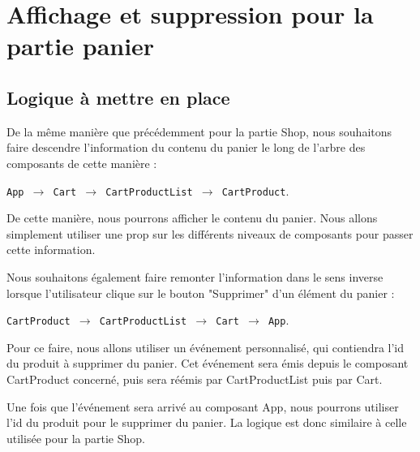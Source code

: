 \documentclass{article}
\begin{document}
\section{Affichage et suppression pour la partie panier}
\subsection{Logique à mettre en place}
De la même manière que précédemment pour la partie {\color{monOrange}Shop}, nous souhaitons faire descendre l'information du contenu du panier le long de l'arbre des composants de cette manière :
\begin{center}
{\tt App $\to$ Cart $\to$ CartProductList $\to$ CartProduct}.
\end{center}
De cette manière, nous pourrons afficher le contenu du panier. Nous allons simplement utiliser une {\color{monOrange}prop} sur les différents niveaux de composants pour passer cette information.

Nous souhaitons également faire remonter l'information dans le sens inverse lorsque l'utilisateur clique sur le bouton "Supprimer" d'un élément du panier :

\begin{center}
{\tt CartProduct $\to$ CartProductList $\to$ Cart $\to$ App}.
\end{center}
Pour ce faire, nous allons utiliser un événement personnalisé, qui contiendra l'{\color{monOrange}id} du produit à supprimer du panier. Cet événement sera émis depuis le composant {\color{monOrange}CartProduct} concerné, puis sera réémis par {\color{monOrange}CartProductList} puis par {\color{monOrange}Cart}.

Une fois que l'événement sera arrivé au composant {\color{monOrange}App}, nous pourrons utiliser l'{\color{monOrange}id} du produit pour le supprimer du panier. La logique est donc similaire à celle utilisée pour la partie {\color{monOrange}Shop}.
\end{document}
